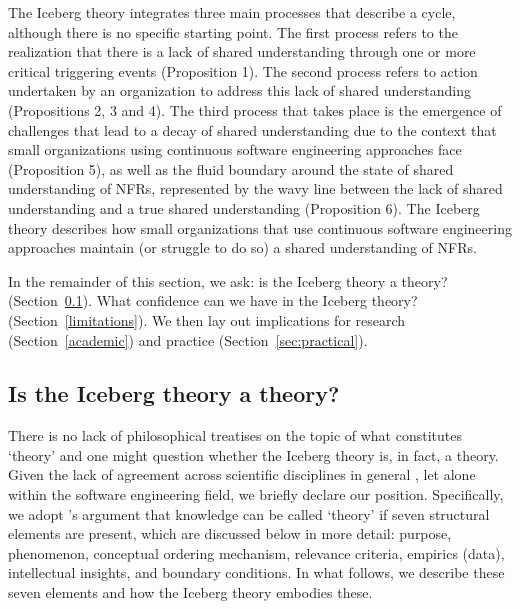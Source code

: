 \documentclass[smallextended]{svjour3}       %
\begin{document}
The Iceberg theory integrates three main processes that describe a cycle, although there is no specific starting point. 
The first process refers to the realization that there is a lack of shared understanding through one or more critical triggering events (Proposition 1). 
The second process refers to action undertaken by an organization to address this lack of shared understanding (Propositions 2, 3 and 4). 
The third process that takes place is the emergence of challenges that lead to a decay of shared understanding due to the context that small organizations using continuous software engineering approaches face (Proposition 5), as well as the fluid boundary around the state of shared understanding of NFRs, represented by the wavy line between the lack of shared understanding and a true shared understanding (Proposition 6).
The Iceberg theory describes how small organizations that use continuous software engineering approaches maintain (or struggle to do so) a shared understanding of NFRs. 

In the remainder of this section, we ask: is the Iceberg theory a theory? (Section~\ref{sec:sandberg}). What confidence can we have in the Iceberg theory? (Section~\ref{limitations}). We then lay out implications for research (Section~\ref{academic}) and practice (Section~\ref{sec:practical}). 


\subsection{Is the Iceberg theory a theory?}
\label{sec:sandberg}

There is no lack of philosophical treatises on the topic of what constitutes `theory' and one might question whether the Iceberg theory is, in fact, a theory. Given the lack of agreement across scientific disciplines in general \citep{sandberg2021meanings,stol2024theorizing,mintzberg2017developing}, let alone within the software engineering field, we briefly declare our position. 
Specifically, we adopt \cite{sandberg2021meanings}'s argument that knowledge can be called `theory' if seven structural elements are present, which are discussed below in more detail: purpose, phenomenon, conceptual ordering mechanism, relevance criteria, empirics (data), intellectual insights, and boundary conditions. In what follows, we describe these seven elements and how the Iceberg theory embodies these.
\end{document}
